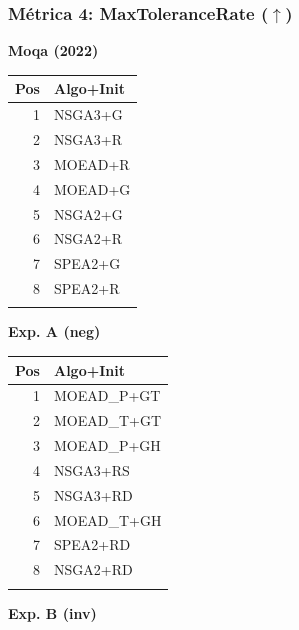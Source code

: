 \documentclass[a4paper,10pt]{article}
\begin{document}
\subsubsection{Métrica 4: MaxToleranceRate \texorpdfstring{($\uparrow$)}{(up)}}
\begin{table}[H]
    \centering
    \begin{minipage}[t]{0.32\textwidth}
        \centering\scriptsize\textbf{Moqa (2022)}\\
        \begin{tabular}{rl}
            \toprule
            Pos & Algo+Init \\ \midrule
            1 & NSGA3+G \\
            2 & NSGA3+R \\
            3 & MOEAD+R \\
            4 & MOEAD+G \\
            5 & NSGA2+G \\
            6 & NSGA2+R \\
            7 & SPEA2+G \\
            8 & SPEA2+R \\
            \\
            \bottomrule
        \end{tabular}
    \end{minipage}
    \hfill
    \begin{minipage}[t]{0.32\textwidth}
        \centering\scriptsize\textbf{Exp. A (neg)}\\
        \begin{tabular}{rl}
            \toprule
            Pos & Algo+Init \\ \midrule
            1 & MOEAD\_P+GT \\
            2 & MOEAD\_T+GT \\
            3 & MOEAD\_P+GH \\
            4 & NSGA3+RS \\
            5 & NSGA3+RD \\
            6 & MOEAD\_T+GH \\
            7 & SPEA2+RD \\
            8 & NSGA2+RD \\
            \\
            \bottomrule
        \end{tabular}
    \end{minipage}
    \hfill
    \begin{minipage}[t]{0.32\textwidth}
        \centering\scriptsize\textbf{Exp. B (inv)}\\

\end{minipage}
\end{table}
\end{document}

